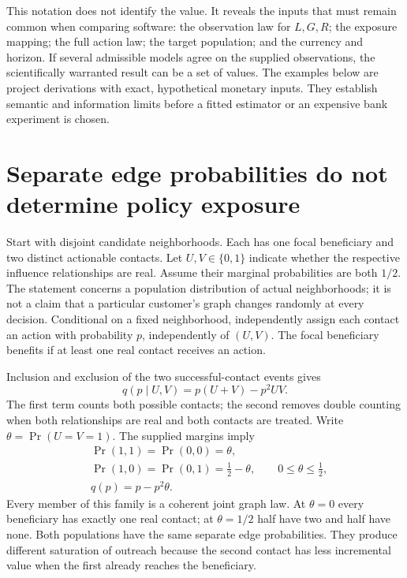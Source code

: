 This notation does not identify the value. It reveals the inputs that must
remain common when comparing software: the observation law for $L,G,R$;
the exposure mapping; the full action law; the target population; and the
currency and horizon. If several admissible models agree on the supplied
observations, the scientifically warranted result can be a set of values.
The examples below are project derivations with exact, hypothetical monetary
inputs. They establish semantic and information limits before a fitted
estimator or an expensive bank experiment is chosen.\citep{exec17_s7_math}

\section{Separate edge probabilities do not determine policy exposure}
\label{exec17:s7-overlap}

Start with disjoint candidate neighborhoods. Each has one focal beneficiary and
two distinct actionable contacts. Let $U,V\in\{0,1\}$ indicate whether the
respective influence relationships are real. Assume their marginal probabilities
are both $1/2$. The statement concerns a population distribution of actual
neighborhoods; it is not a claim that a particular customer's graph changes
randomly at every decision. Conditional on a fixed neighborhood, independently
assign each contact an action with probability $p$, independently of $(U,V)$.
The focal beneficiary benefits if at least one real contact receives an action.

Inclusion and exclusion of the two successful-contact events gives
\begin{equation}
 q(p\mid U,V)=p(U+V)-p^2UV.
 \label{exec17:s7-exposure}
\end{equation}
The first term counts both possible contacts; the second removes double counting
when both relationships are real and both contacts are treated. Write
$\theta=\Pr(U=V=1)$. The supplied margins imply
\begin{equation}
 \begin{split}
  &\Pr(1,1)=\Pr(0,0)=\theta,\\
  &\Pr(1,0)=\Pr(0,1)=\tfrac12-\theta,
  \qquad 0\leq\theta\leq\tfrac12,\\
  &q(p)=p-p^2\theta.
 \end{split}
 \label{exec17:s7-sharp-family}
\end{equation}
Every member of this family is a coherent joint graph law. At $\theta=0$ every
beneficiary has exactly one real contact; at $\theta=1/2$ half have two and half
have none. Both populations have the same separate edge probabilities. They
produce different saturation of outreach because the second contact has less
incremental value when the first already reaches the beneficiary.

